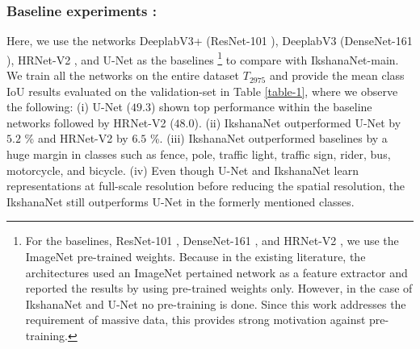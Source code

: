 \documentclass{article}
\begin{document}
\subsubsection{Baseline experiments :}
\label{4.2.1}
Here, we use the networks DeeplabV3+ (ResNet-101 \cite{he2016deep}), DeeplabV3 (DenseNet-161 \cite{huang2017densely}), HRNet-V2 \cite{SunZJCXLMWLW19}, and U-Net \cite{ronneberger2015u} as the baselines \footnote{ For the baselines, ResNet-101 \cite{he2016deep}, DenseNet-161 \cite{huang2017densely}, and HRNet-V2 \cite{SunZJCXLMWLW19}, we use the ImageNet \cite{deng2009imagenet} pre-trained weights. Because in the existing literature, the architectures \cite{chen2018encoder,zhao2017pyramid,10.1007/978-3-030-58539-6_11,SunZJCXLMWLW19} used an ImageNet pertained network as a feature extractor and reported the results by using pre-trained weights only. However, in the case of IkshanaNet and U-Net \cite{ronneberger2015u} no pre-training is done. Since this work addresses the requirement of massive data, this provides strong motivation against pre-training.} to compare with IkshanaNet-main.\newline
We train all the networks on the entire dataset $T_{2975}$ and provide the mean class IoU results evaluated on the validation-set in Table \ref{table-1}, where we observe the following: \newline
(i) U-Net \cite{ronneberger2015u} ($49.3$) shown top performance within the baseline networks followed by  HRNet-V2 \cite{SunZJCXLMWLW19} ($48.0$).\newline
(ii) IkshanaNet outperformed U-Net by $5.2$ \% and HRNet-V2 \cite{SunZJCXLMWLW19} by $6.5$ \%.\newline
(iii) IkshanaNet outperformed baselines by a huge margin in classes such as fence, pole, traffic light, traffic sign, rider, bus, motorcycle, and bicycle.\newline
(iv) Even though U-Net \cite{ronneberger2015u} and IkshanaNet learn representations at full-scale resolution before reducing the spatial resolution, the IkshanaNet still outperforms U-Net \cite{ronneberger2015u} in the formerly mentioned classes.
\end{document}
